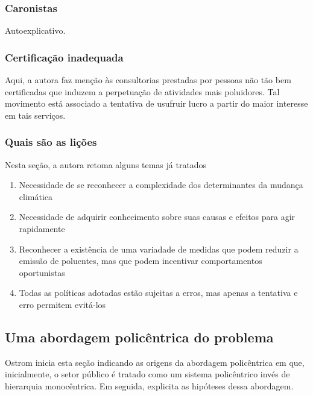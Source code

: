 \documentclass[11pt]{article}
\begin{document}
\subsubsection{Caronistas}
\label{sec:orgf7ff27b}
Autoexplicativo.

\subsubsection{Certificação inadequada}
\label{sec:org7b185ac}
Aqui, a autora faz menção às consultorias prestadas por pessoas não tão bem certificadas que induzem a perpetuação de atividades mais poluidores.
Tal movimento está associado a tentativa de usufruir lucro a partir do maior interesse em tais serviços.

\subsubsection{Quais são as lições}
\label{sec:org4151d5e}

Nesta seção, a autora retoma alguns temas já tratados

\begin{enumerate}
\item Necessidade de se reconhecer a complexidade dos determinantes da mudança climática
\item Necessidade de adquirir conhecimento sobre suas causas e efeitos para agir rapidamente
\item Reconhecer a existência de uma variadade de medidas que podem reduzir a emissão de poluentes, mas que podem incentivar comportamentos oportunistas
\item Todas as políticas adotadas estão sujeitas a erros, mas apenas a tentativa e erro permitem evitá-los
\end{enumerate}

\subsection{Uma abordagem policêntrica do problema}
\label{sec:org30d021e}


Ostrom inicia esta seção indicando as origens da abordagem policêntrica em que, inicialmente, o setor público é tratado como um sistema policêntrico invés de hierarquia monocêntrica.
Em seguida, explicita as hipóteses dessa abordagem.
\end{document}
